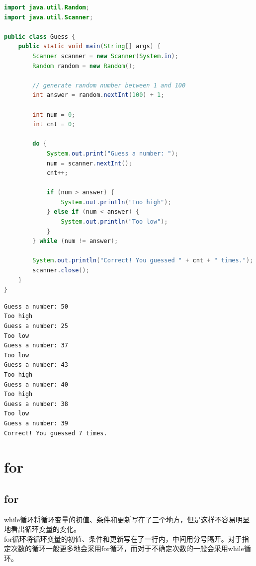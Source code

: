 \begin{lstlisting}[language=Java]
import java.util.Random;
import java.util.Scanner;

public class Guess {
    public static void main(String[] args) {
        Scanner scanner = new Scanner(System.in);
        Random random = new Random();

        // generate random number between 1 and 100
        int answer = random.nextInt(100) + 1;

        int num = 0;
        int cnt = 0;

        do {
            System.out.print("Guess a number: ");
            num = scanner.nextInt();
            cnt++;

            if (num > answer) {
                System.out.println("Too high");
            } else if (num < answer) {
                System.out.println("Too low");
            }
        } while (num != answer);

        System.out.println("Correct! You guessed " + cnt + " times.");
        scanner.close();
    }
}
\end{lstlisting}

\begin{tcolorbox}
    \begin{verbatim}
Guess a number: 50
Too high
Guess a number: 25
Too low
Guess a number: 37
Too low
Guess a number: 43
Too high
Guess a number: 40
Too high
Guess a number: 38
Too low
Guess a number: 39
Correct! You guessed 7 times.
\end{verbatim}
\end{tcolorbox}

\newpage

\section{for}

\subsection{for}

while循环将循环变量的初值、条件和更新写在了三个地方，但是这样不容易明显地看出循环变量的变化。\\

for循环将循环变量的初值、条件和更新写在了一行内，中间用分号隔开。对于指定次数的循环一般更多地会采用for循环，而对于不确定次数的一般会采用while循环。

\vspace{-0.5cm}

